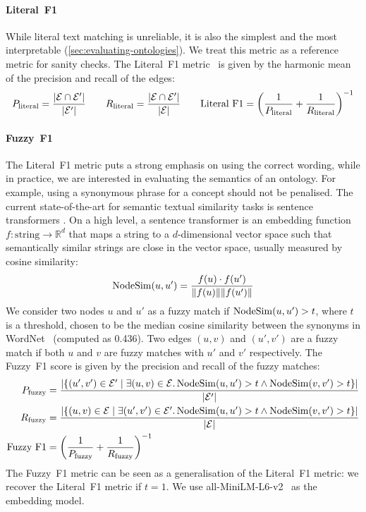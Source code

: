\paragraph{Literal~F1}
While literal text matching is unreliable, it is also the simplest and the most interpretable (\cref{sec:evaluating-ontologies}). We treat this metric as a reference metric for sanity checks. The Literal~F1 metric~\cite{Kashyap2005TaxaMinerAE} is given by the harmonic mean of the precision and recall of the edges:
\[
    P_{\text{literal}} = \frac{|\mathcal{E} \cap \mathcal{E}'|}{|\mathcal{E}'|} \qquad
    R_{\text{literal}} = \frac{|\mathcal{E} \cap \mathcal{E}'|}{|\mathcal{E}|} \qquad
    \text{Literal~F1} = \left(\frac{1}{P_{\text{literal}}} + \frac{1}{R_{\text{literal}}}\right)^{-1}
\]

\paragraph{Fuzzy~F1}
The Literal~F1 metric puts a strong emphasis on using the correct wording, while in practice, we are interested in evaluating the semantics of an ontology. For example, using a synonymous phrase for a concept should not be penalised. The current state-of-the-art for semantic textual similarity tasks is sentence transformers \cite{reimers-2019-sentence-bert,jiang2022improved,jiang2019smart}. On a high level, a sentence transformer is an embedding function $f: \text{string} \to \mathbb{R}^d$ that maps a string to a $d$-dimensional vector space such that semantically similar strings are close in the vector space, usually measured by cosine similarity:
\[
    \operatorname{NodeSim}(u, u') = \frac{f(u) \cdot f(u')}{\norm{f(u)} \norm{f(u')}}
\]
We consider two nodes $u$ and $u'$ as a fuzzy match if $\operatorname{NodeSim}(u, u') > t$, where $t$ is a threshold, chosen to be the median cosine similarity between the synonyms in WordNet~\cite{miller1995wordnet} (computed as 0.436). Two edges $(u, v)$ and $(u', v')$ are a fuzzy match if both $u$ and $v$ are fuzzy matches with $u'$ and $v'$ respectively. The Fuzzy~F1 score is given by the precision and recall of the fuzzy matches:
\begin{equation*}
    \begin{aligned}
        P_{\text{fuzzy}} & = \frac{|
            \{(u', v') \in \mathcal{E}' \mid \exists (u, v) \in \mathcal{E}.
            \operatorname{NodeSim}(u, u') > t \land \operatorname{NodeSim}(v, v') > t
            \}
        |}{|\mathcal{E}'|}                                                                                      \\
        R_{\text{fuzzy}} & = \frac{|
            \{(u, v) \in \mathcal{E} \mid \exists (u', v') \in \mathcal{E}'.
            \operatorname{NodeSim}(u, u') > t \land \operatorname{NodeSim}(v, v') > t
            \}
        |}{|\mathcal{E}|}                                                                                       \\
        \text{Fuzzy~F1}  & = \left(\frac{1}{P_{\text{fuzzy}}} + \frac{1}{R_{\text{fuzzy}}}\right)^{-1}
    \end{aligned}
\end{equation*}
The Fuzzy~F1 metric can be seen as a generalisation of the Literal~F1 metric: we recover the Literal~F1 metric if $t = 1$. We use all-MiniLM-L6-v2~\cite{wang2020minilm,reimers-2019-sentence-bert} as the embedding model.

